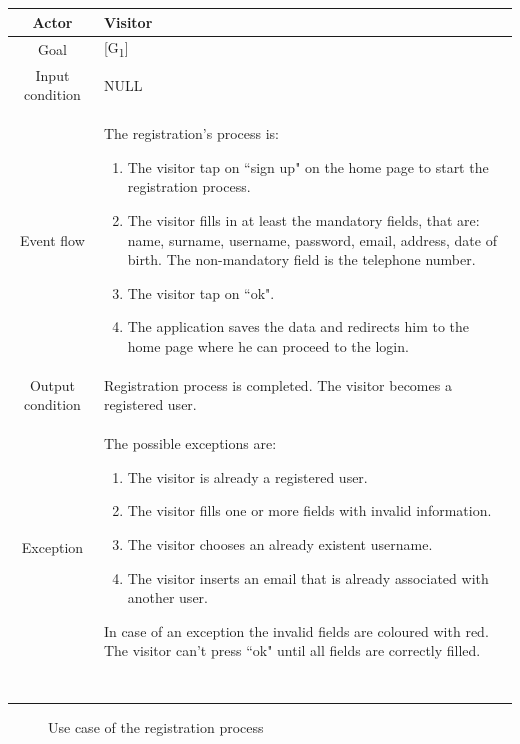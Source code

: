 \documentclass[12pt,titlepage]{article}
\begin{document}
\begin{tabular}{cp{10cm}} 
Actor&Visitor\\ \hline 
Goal& {[G\textsubscript{1}]}\\ \hline
Input condition&NULL \\ \hline
Event flow&The registration's process is: \begin{enumerate}
\item The visitor tap on ``sign up" on the home page to start the registration process.
\item The visitor fills in at least the mandatory fields, that are: name, surname, username, password, email, address, date of birth. The non-mandatory field is the telephone number.
\item The visitor tap on ``ok".
\item The application saves the data and redirects him to the home page where he can proceed to the login.
\end{enumerate} \\ \hline
Output condition&Registration process is completed. The visitor becomes a registered user. \\ \hline
Exception& The possible exceptions are:
\begin{enumerate}
\item The visitor is already a registered user.
\item The visitor fills one or more fields with invalid information.
\item The visitor chooses an already existent username.
\item The visitor inserts an email that is already associated with another user.
\end{enumerate} 
In case of an exception the invalid fields are coloured with red. The visitor can't press ``ok" until all fields are correctly filled.\\ \hline \

\end{tabular}

\pagebreak

\begin{figure}
\centering
{}
\caption{Use case of the registration process}

\end{figure}
\end{document}
